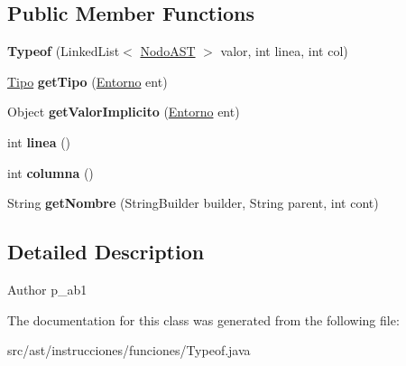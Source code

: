 \subsection*{Public Member Functions}
\begin{DoxyCompactItemize}
\item 
\mbox{\label{classast_1_1instrucciones_1_1funciones_1_1_typeof_a908895489aaf4127c246e59b36963a31}} 
{\bfseries Typeof} (Linked\+List$<$ \mbox{\hyperlink{interfaceast_1_1_nodo_a_s_t}{Nodo\+A\+ST}} $>$ valor, int linea, int col)
\item 
\mbox{\label{classast_1_1instrucciones_1_1funciones_1_1_typeof_ac15f6ad79e31e790ff634354a97ab7ba}} 
\mbox{\hyperlink{classentorno_1_1_tipo}{Tipo}} {\bfseries get\+Tipo} (\mbox{\hyperlink{classentorno_1_1_entorno}{Entorno}} ent)
\item 
\mbox{\label{classast_1_1instrucciones_1_1funciones_1_1_typeof_a01492a71519eec4bc8b7e9c12a924023}} 
Object {\bfseries get\+Valor\+Implicito} (\mbox{\hyperlink{classentorno_1_1_entorno}{Entorno}} ent)
\item 
\mbox{\label{classast_1_1instrucciones_1_1funciones_1_1_typeof_a5ade3fee74ef54aeebd5f9f698779776}} 
int {\bfseries linea} ()
\item 
\mbox{\label{classast_1_1instrucciones_1_1funciones_1_1_typeof_a87fe920f017636db6372097d9abd51fd}} 
int {\bfseries columna} ()
\item 
\mbox{\label{classast_1_1instrucciones_1_1funciones_1_1_typeof_a7bb76411ad89a0bdce2083d197775fb5}} 
String {\bfseries get\+Nombre} (String\+Builder builder, String parent, int cont)
\end{DoxyCompactItemize}


\subsection{Detailed Description}
\begin{DoxyAuthor}{Author}
p\+\_\+ab1 
\end{DoxyAuthor}


The documentation for this class was generated from the following file\+:\begin{DoxyCompactItemize}
\item 
src/ast/instrucciones/funciones/Typeof.\+java\end{DoxyCompactItemize}

